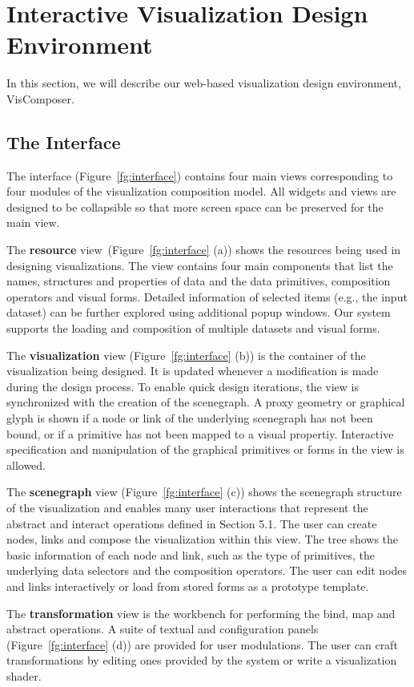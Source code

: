 \section{Interactive Visualization Design Environment}
\label{sec:environment}
In this section, we will describe our web-based visualization design environment, VisComposer.

\subsection{The Interface}
The interface (Figure~\ref{fg:interface}) contains four main views corresponding to four modules of the visualization composition model. All widgets and views are designed to be collapsible so that more
screen space can be preserved for the main view.

The \textbf{resource} view~(Figure~\ref{fg:interface} (a)) shows the resources being used in designing visualizations. The view contains four main components that list the names, structures and properties of data and the data primitives, composition operators and visual forms. Detailed information of selected items (e.g., the input dataset) can be further explored using additional popup windows. Our system supports the loading and composition of multiple datasets and visual forms.

The \textbf{visualization} view (Figure~\ref{fg:interface} (b)) is the container of the visualization being designed.  It is updated whenever a modification is made during the design process. To enable quick design iterations, the view is synchronized with the creation of the scenegraph.  A proxy geometry or graphical glyph is shown if a node or link of the underlying scenegraph has not been bound, or if a primitive has not been mapped to a visual propertiy. Interactive specification and manipulation of the graphical primitives or forms in the view is allowed.

The \textbf{scenegraph} view (Figure~\ref{fg:interface} (c)) shows the scenegraph structure of the visualization and enables many user interactions that represent the abstract and interact operations defined in Section 5.1. The user can create nodes, links and compose the visualization within this view. The tree shows the basic information of each node and link, such as the type of primitives, the underlying data selectors and the composition operators. The user can edit nodes and links interactively or load from stored forms as a prototype template.

The \textbf{transformation} view is the workbench for performing the bind, map and abstract operations. A suite of textual and configuration panels (Figure~\ref{fg:interface} (d)) are provided for user modulations. The user can craft transformations by editing ones provided by the system or write a visualization shader.

